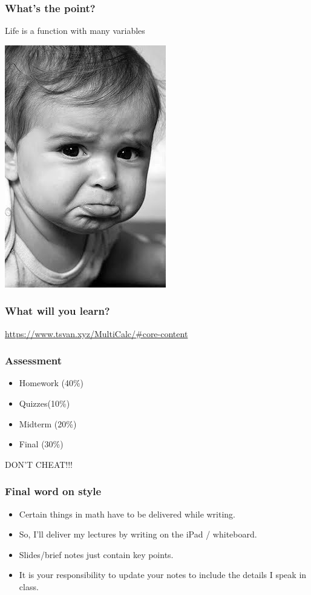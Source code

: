 \documentclass[aspectratio=169]{beamer}
\begin{document}
\begin{frame}
    \frametitle{What's the point?}
    Life is a function with many variables \pause

    \centering
    \includegraphics[height=0.5\textheight]{sad}
\end{frame}

\begin{frame}
    \frametitle{What will you learn?}
    \url{https://www.tsvan.xyz/MultiCalc/\#core-content}
\end{frame}


\begin{frame}
    \frametitle{Assessment}
    \begin{itemize}
        \item Homework (40\%)
        \item Quizzes(10\%)
        \item Midterm (20\%)
        \item Final (30\%)
    \end{itemize}
\end{frame}

\begin{frame}
    \centering
    DON'T CHEAT!!!
\end{frame}

\begin{frame}
    \frametitle{Final word on style}
    \begin{itemize}
        \item Certain things in math have to be delivered while writing.
        \item So, I'll deliver my lectures by writing on the iPad / whiteboard.
        \item Slides/brief notes just contain key points.
        \item It is your responsibility to update your notes to include the details I speak in class.
    \end{itemize}



\end{frame}
\end{document}

